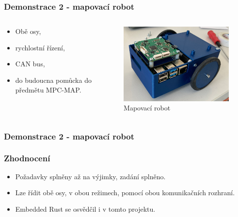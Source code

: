 \documentclass[%
  12pt,       				%
	t,                  %
	aspectratio=1610,   %
	unicode,						%
]{beamer}				    	%
\begin{document}
\begin{frame}
	\frametitle{Demonstrace 2 - mapovací robot}
	\begin{columns}[T] 								%
		\begin{column}{0.4\textwidth}
			\begin{itemize}
				\item Obě osy,
				\item rychlostní řízení,
				\item CAN bus,
				\item do budoucna pomůcka do předmětu MPC-MAP.
			\end{itemize}
		\end{column}
		\begin{column}{0.6\textwidth}		%
			\begin{figure}%
				\centering
				\includegraphics[width=0.8\columnwidth]{../Thesis/obrazky/map_bot}
				\caption{Mapovací robot}%
				\label{fig:sm4_block}
			\end{figure}
		\end{column}
	\end{columns}
\end{frame}

\begin{frame}
	\frametitle{Demonstrace 2 - mapovací robot}
\end{frame}

\begin{frame}
	\frametitle{Zhodnocení}
	\begin{itemize}
		\item Požadavky splněny až na výjimky, zadání splněno.
		\item Lze řídit obě osy, v obou režimech, pomocí obou komunikačních rozhraní.
		\item Embedded Rust se osvědčil i v tomto projektu.
	\end{itemize}
\end{frame}
\end{document}
